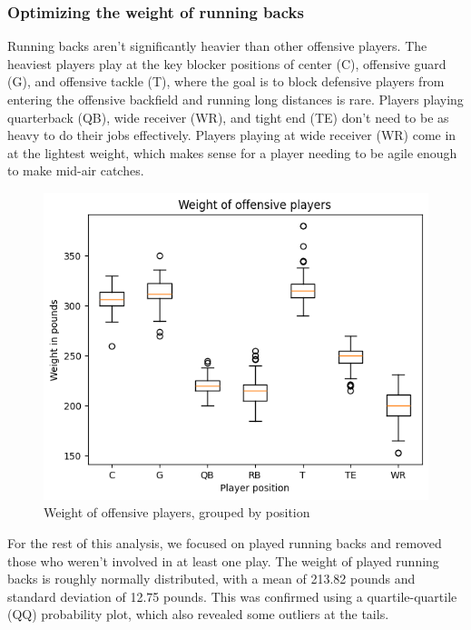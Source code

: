\documentclass[bibtex, sigconf, hyperref={colorlinks=true,linkcolor=blue,urlcolor=blue}]{acmart}
\begin{document}
\subsubsection{Optimizing the weight of running backs}

Running backs aren't significantly heavier than other offensive players. The
heaviest players play at the key blocker positions of center (C), offensive
guard (G), and offensive tackle (T), where the goal is to block defensive
players from entering the offensive backfield and running long distances is
rare. Players playing quarterback (QB), wide receiver (WR), and tight end (TE)
don't need to be as heavy to do their jobs effectively. Players playing at wide
receiver (WR) come in at the lightest weight, which makes sense for a player
needing to be agile enough to make mid-air catches.

\begin{figure}[h]
  \centering
  \includegraphics[width=\linewidth]{weight-of-offensive-players.png}
  \caption{Weight of offensive players, grouped by position}
\end{figure}

For the rest of this analysis, we focused on played running backs and removed
those who weren't involved in at least one play. The weight of played running
backs is roughly normally distributed, with a mean of 213.82 pounds and standard
deviation of 12.75 pounds. This was confirmed using a quartile-quartile (QQ)
probability plot, which also revealed some outliers at the tails.
\end{document}
